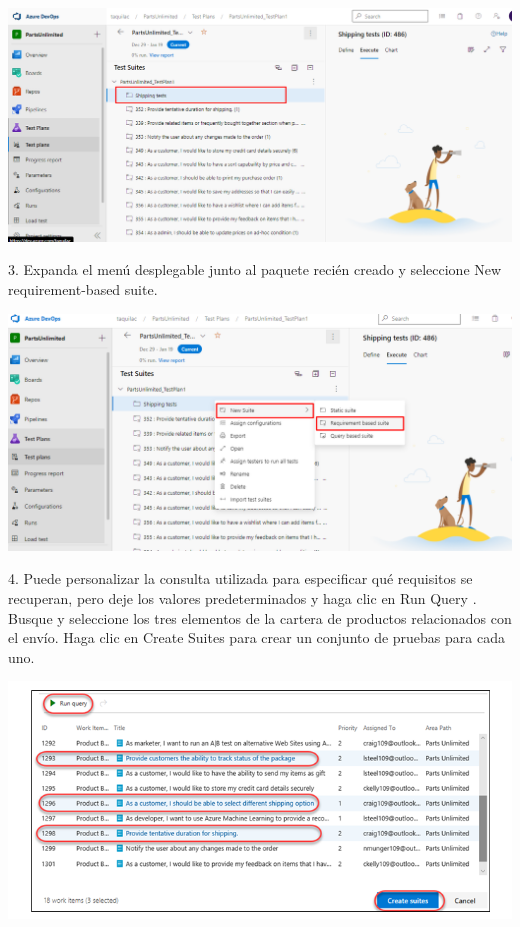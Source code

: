 \documentclass[12pt,letterpaper]{article}
\begin{document}
\begin{center}
		\includegraphics[width=15cm]{./Imagenes/31} 
\end{center}

3. Expanda el menú desplegable junto al paquete recién creado y seleccione New requirement-based suite.

\begin{center}
		\includegraphics[width=15cm]{./Imagenes/32} 
\end{center}

4. Puede personalizar la consulta utilizada para especificar qué requisitos se recuperan, pero deje los valores predeterminados y haga clic en Run Query . Busque y seleccione los tres elementos de la cartera de productos relacionados con el envío. Haga clic en Create Suites para crear un conjunto de pruebas para cada uno.

\begin{center}
		\includegraphics[width=15cm]{./Imagenes/40} 
\end{center}
\end{document}
